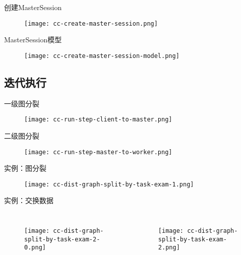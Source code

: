 \begin{frame}{创建MasterSession}
  \begin{figure}
    \centering
    \texttt{[image: cc-create-master-session.png]}
  \end{figure}
\end{frame}

\begin{frame}{MasterSession模型}
  \begin{figure}
    \centering
    \texttt{[image: cc-create-master-session-model.png]}
  \end{figure}
\end{frame}

\subsection{迭代执行}

\begin{frame}{一级图分裂}
  \begin{figure}
    \centering
    \texttt{[image: cc-run-step-client-to-master.png]}
  \end{figure}
\end{frame}

\begin{frame}{二级图分裂}
  \begin{figure}
    \centering
    \texttt{[image: cc-run-step-master-to-worker.png]}
  \end{figure}
\end{frame}

\begin{frame}{实例：图分裂}
  \begin{figure}
    \centering
    \texttt{[image: cc-dist-graph-split-by-task-exam-1.png]}
  \end{figure}
\end{frame}

\begin{frame}{实例：交换数据}
\begin{columns}

  \begin{figure}
    \centering
    \texttt{[image: cc-dist-graph-split-by-task-exam-2-0.png]}
  \end{figure}

  \begin{figure}
    \centering
    \texttt{[image: cc-dist-graph-split-by-task-exam-2.png]}
  \end{figure}

\end{columns}
\end{frame}
